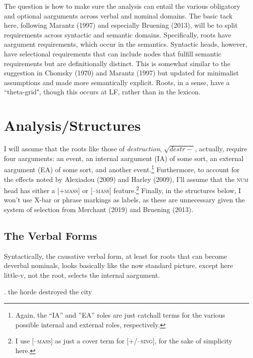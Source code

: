 \documentclass[12pt]{article}
\begin{document}
The question is how to make sure the analysis can entail the various obligatory and optional aarguments across verbal and nominal domains. The basic tack here, following Marantz (1997) and especially Bruening (2013), will be to split requirements across syntactic and semantic domains. Specifically, roots have aargument requirements, which occur in the semantics. Syntactic heads, however, have selectional requirements that can include nodes that fulfill semantic requirements but are definitionally distinct. This is somewhat similar to the suggestion in Chomsky (1970) and Marantz (1997) but updated for minimalist assumptions and made more semantically explicit. Roots, in a sense, have a ``theta-grid", though this occurs at LF, rather than in the lexicon.

\section{Analysis/Structures}\label{strucs}

I will assume that the roots like those of \textit{destruction}, $\sqrt{destr-}$, actually, require four aarguments: an event, an internal aargument (IA) of some sort, an external aargument (EA) of some sort, and another event.\footnote{ Again, the ``IA'' and ''EA'' roles are just catchall terms for the various possible internal and external roles, respectively.} Furthermore, to account for the effects noted by Alexiadou (2009) and Harley (2009), I'll assume that the \textsc{num} head has either a [+\textsc{mass}] or [--\textsc{mass}] feature.\footnote{ I use [--\textsc{mass}] as just a cover term for [+/--\textsc{sing}], for the sake of simplicity here.} Finally, in the structures below, I won't use X-bar or phrase markings as labels, as these are unnecessary given the system of selection from Merchant (2019) and Bruening (2013).

\subsection{The Verbal Forms}\label{strucs1}

Syntactically, the causative verbal form, at least for roots that can become deverbal nominals, looks basically like the now standard picture, except here little-v, not the root, selects the internal aargument. 

\singlespacing

\ex. \label{causeverb} the horde destroyed the city
\end{document}
